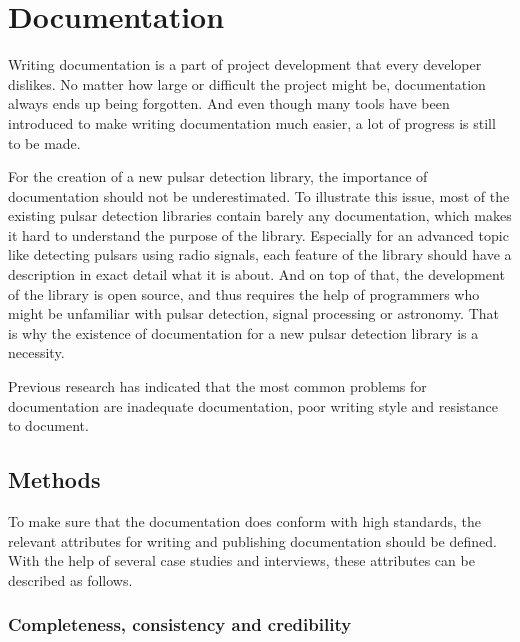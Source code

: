 \documentclass{article}
\begin{document}
    

\section{Documentation}


    Writing documentation is a part of project development that every developer dislikes. No matter how large or difficult the project might be,
    documentation always ends up being forgotten. And even though many tools have been introduced to make writing documentation much easier, a
    lot of progress is still to be made.\cite{voigt2}\cite{watson}

    For the creation of a new pulsar detection library, the importance of documentation should not be underestimated. To illustrate this issue, most of the existing
    pulsar detection libraries contain barely any documentation, which makes it hard to understand the purpose of the library. Especially for an advanced
    topic like detecting pulsars using radio signals, each feature of the library should have a description in exact detail what it is about. And on top 
    of that, the development of the library is open source, and thus requires the help of programmers who might be unfamiliar with pulsar detection, signal 
    processing or astronomy. That is why the existence of documentation for a new pulsar detection library is a necessity.

    Previous research has indicated that the most common problems for documentation are inadequate documentation, poor writing style and resistance to document.\cite{garousi}

\subsection{Methods}


    To make sure that the documentation does conform with high standards, the relevant attributes for writing and publishing documentation should be defined.
    With the help of several case studies and interviews, these attributes can be described as follows.

    \subsubsection{Completeness, consistency and credibility}
\end{document}
